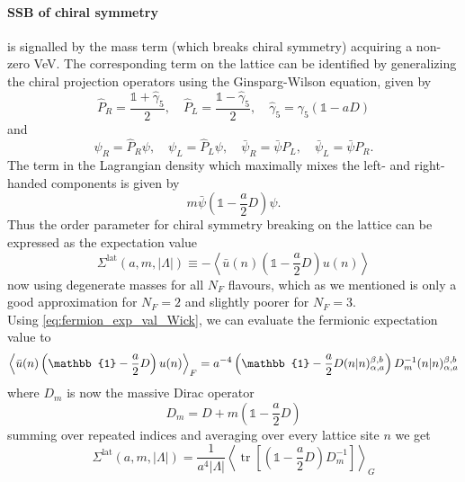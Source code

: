 \documentclass[a4paper,10pt]{book}
\begin{document}
\paragraph{SSB of chiral symmetry} is signalled by the mass term (which breaks chiral symmetry) acquiring a non- zero VeV. The corresponding term on the lattice can be identified by generalizing the chiral projection operators using the Ginsparg-Wilson equation, given by
\begin{equation}
\widehat{P}_{R}=\frac{\mathbb{1}+\widehat{\gamma}_{5}}{2}, \quad \widehat{P}_{L}=\frac{\mathbb{1}-\widehat{\gamma}_{5}}{2}, \quad \widehat{\gamma}_{5}=\gamma_{5}(\mathbb{1}-a D)
\end{equation}
and
\begin{equation}
\psi_{R}=\widehat{P}_{R} \psi, \quad \psi_{L}=\widehat{P}_{L} \psi, \quad \bar{\psi}_{R}=\bar{\psi} P_{L}, \quad \bar{\psi}_{L}=\bar{\psi} P_{R}.
\end{equation}
The term in the Lagrangian density which maximally mixes the left- and right-handed components is given by
\begin{equation}
m \bar{\psi}\left(\mathbb{1}-\frac{a}{2} D\right) \psi.
\end{equation}
Thus the order parameter for chiral symmetry breaking on the lattice can be expressed as the expectation value 
\begin{equation}
\Sigma^{\mathrm{lat}}(a, m,|\Lambda|) \equiv-\left\langle\bar{u}(n)\left(\mathbb{1}-\frac{a}{2} D\right) u(n)\right\rangle
\end{equation}
now using degenerate masses for all $N_F$ flavours, which as we mentioned is only a good approximation for $N_F =2$ and slightly poorer for $N_F=3$.\\Using \eqref{eq:fermion_exp_val_Wick}, we can evaluate the fermionic expectation value to
\begin{equation}
\left\langle\bar{u}(n)\left(\mathbb{1}-\frac{a}{2} D\right) u(n)\right\rangle_F = a^{-4}\left(\mathbb{1}-\frac{a}{2} D(n\mkern-5mu \mid\mkern-5mu n)_{\alpha,a}^{ \beta,b}\right)D_m^{-1}(n\mkern-5mu \mid\mkern-5mu n)_{\alpha,a}^{ \beta,b}
\end{equation}
where $D_m$ is now the massive Dirac operator 
\begin{equation}
 D_m = D+m\left(\mathbb{1}-\frac{a}{2} D\right)
\end{equation} 
summing over repeated indices and averaging over every lattice site $n$ we get 
\begin{equation}\label{eq:chiral_condensate_exp_val}
\Sigma^{\operatorname{lat}}(a, m,|\Lambda|)=\frac{1}{a^{4}|\Lambda|}\left\langle\operatorname{tr}\left[\left(\mathbb{1}-\frac{a}{2} D\right) D_{m}^{-1}\right]\right\rangle_{G}
\end{equation}
\end{document}
